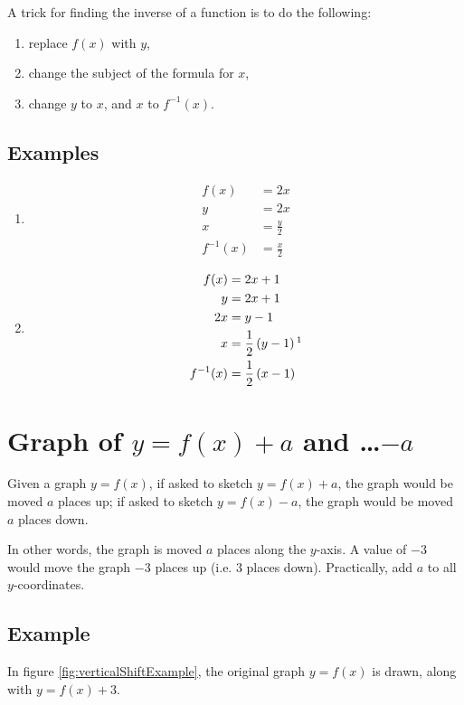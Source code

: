 A trick for finding the inverse of a function is to do the following:
\begin{enumerate}
	\item replace $f(x)$ with $y$,
	\item change the subject of the formula for $x$,
	\item change $y$ to $x$, and $x$ to $f^{-1}(x)$.
\end{enumerate}

\subsection{Examples}
\begin{enumerate}
	\item
	\begin{align*}
		f(x)&=2x\\
		y&=2x\\
		x&=\frac{y}{2}\\
		f^{-1}(x)&=\frac{x}{2}
	\end{align*}
	\item
	\begin{align*}
		f(x)&=2x+1\\
		y&=2x+1\\
		2x&=y-1\\
		x&=\frac{1}{2}\left(y-1\right)\footnotemark\\
		f^{-1}(x)&=\frac{1}{2}\left(x-1\right)
	\end{align*}
\end{enumerate}


\section{Graph of $y=f(x)+a$ and \dots$-a$}
Given a graph $y=f(x)$, if asked to sketch $y=f(x)+a$, the graph would be moved $a$ places up; if asked to sketch $y=f(x)-a$, the graph would be moved $a$ places down.

In other words, the graph is moved $a$ places along the $y$-axis. A value of $-3$ would move the graph $-3$ places up (i.e. $3$ places down). Practically, add $a$ to all $y$-coordinates.

\subsection{Example}
In figure \ref{fig:verticalShiftExample}, the original graph $y=f(x)$ is drawn, along with $y=f(x)+3$.

